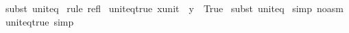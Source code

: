 \begin{isabellebody}
%
\isadelimproof
%
\endisadelimproof
%
\isatagproof
{}\isamarkupfalse%
\ {\isacharparenleft}subst\ unit{\isacharunderscore}eq{\isacharparenright}\isanewline
{}\isamarkupfalse%
\ {\isacharparenleft}rule\ refl{\isacharparenright}\isanewline
{}\isamarkupfalse%
%
\endisatagproof
{\isafoldproof}%
%
\isadelimproof
\isanewline
%
\endisadelimproof
\isanewline
{}\isamarkupfalse%
\ unit{\isacharunderscore}eq{\isacharunderscore}true{\isacharcolon}\ {\isachardoublequoteopen}{\isacharparenleft}{\isacharparenleft}x{\isacharcolon}{\isacharcolon}unit{\isacharparenright}\ {\isacharequal}\ y{\isacharparenright}\ {\isacharequal}\ True{\isachardoublequoteclose}\isanewline
%
\isadelimproof
%
\endisadelimproof
%
\isatagproof
{}\isamarkupfalse%
\ {\isacharparenleft}{\isacharparenleft}subst\ unit{\isacharunderscore}eq{\isacharparenright}{\isacharparenright}\isanewline
{}\isamarkupfalse%
\ {\isacharparenleft}simp\ {\isacharparenleft}no{\isacharunderscore}asm{\isacharparenright}{\isacharparenright}\isanewline
{}\isamarkupfalse%
%
\endisatagproof
{\isafoldproof}%
%
\isadelimproof
\isanewline
%
\endisadelimproof
\isanewline
{}\isamarkupfalse%
\ unit{\isacharunderscore}eq{\isacharunderscore}true\ {\isacharbrackleft}simp{\isacharbrackright}\isanewline
\isanewline
%
\isadelimtheory
\isanewline
%
\endisadelimtheory
%
\isatagtheory
{}\isamarkupfalse%
%
\endisatagtheory
{\isafoldtheory}%
%
\isadelimtheory
\isanewline
%
\endisadelimtheory
\isanewline
\isanewline
\end{isabellebody}%
